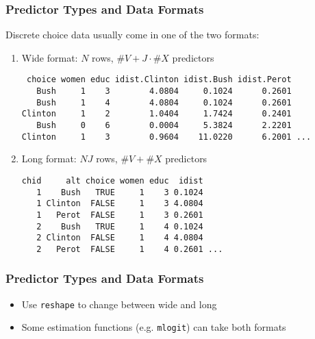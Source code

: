 \documentclass{beamer}
\begin{document}
\begin{frame}[fragile]
\frametitle{Predictor Types and Data Formats}
\small

Discrete choice data usually come in one of the two formats:
\begin{enumerate}
\item Wide format: $N$ rows, $\text{\#}V + J\cdot\text{\#}X$ predictors
\begin{verbatim}
 choice women educ idist.Clinton idist.Bush idist.Perot
   Bush     1    3        4.0804     0.1024      0.2601
   Bush     1    4        4.0804     0.1024      0.2601
Clinton     1    2        1.0404     1.7424      0.2401
   Bush     0    6        0.0004     5.3824      2.2201
Clinton     1    3        0.9604    11.0220      6.2001 ...
\end{verbatim}

\item Long format: $NJ$ rows, $\text{\#}V + \text{\#}X$ predictors
\begin{verbatim}
chid     alt choice women educ  idist
   1    Bush   TRUE     1    3 0.1024
   1 Clinton  FALSE     1    3 4.0804
   1   Perot  FALSE     1    3 0.2601
   2    Bush   TRUE     1    4 0.1024
   2 Clinton  FALSE     1    4 4.0804
   2   Perot  FALSE     1    4 0.2601 ...
\end{verbatim}
\end{enumerate}

\end{frame}


\begin{frame}
\frametitle{Predictor Types and Data Formats}

\begin{itemize}
 \item Use {\tt reshape} to change between wide and long
 \item Some estimation functions (e.g. {\tt mlogit}) can take both formats
\end{itemize}


\end{frame}
\end{document}
